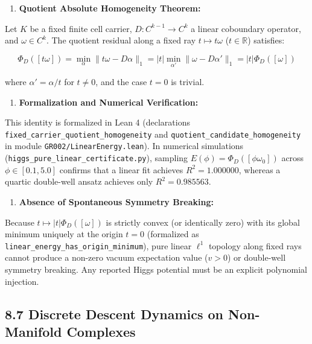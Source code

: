 \documentclass[11pt]{article}
\begin{document}
\begin{enumerate}[leftmargin=1.4em,itemsep=0.2em]
\item \textbf{Quotient Absolute Homogeneity Theorem:}
\end{enumerate}
Let $K$ be a fixed finite cell carrier, $D: C^{k-1} \to C^k$ a linear coboundary operator, and $\omega \in C^k$. The quotient residual along a fixed ray $t \mapsto t\omega$ ($t \in \mathbb{R}$) satisfies:

\begin{equation*}
   \Phi_D([t\omega]) = \min_\alpha \|t\omega - D\alpha\|_1 = |t| \min_{\alpha'} \|\omega - D\alpha'\|_1 = |t| \Phi_D([\omega])
\end{equation*}

where $\alpha' = \alpha / t$ for $t \ne 0$, and the case $t = 0$ is trivial.

\begin{enumerate}[leftmargin=1.4em,itemsep=0.2em]
\item \textbf{Formalization and Numerical Verification:}
\end{enumerate}
This identity is formalized in Lean 4 (declarations \texttt{fixed\_carrier\_quotient\_homogeneity} and \texttt{quotient\_candidate\_homogeneity} in module \texttt{GR002/LinearEnergy.lean}). In numerical simulations (\texttt{higgs\_pure\_linear\_certificate.py}), sampling $E(\phi) = \Phi_D([\phi \omega_0])$ across $\phi \in [0.1, 5.0]$ confirms that a linear fit achieves $R^2 = 1.000000$, whereas a quartic double-well ansatz achieves only $R^2 = 0.985563$.

\begin{enumerate}[leftmargin=1.4em,itemsep=0.2em]
\item \textbf{Absence of Spontaneous Symmetry Breaking:}
\end{enumerate}
Because $t \mapsto |t| \Phi_D([\omega])$ is strictly convex (or identically zero) with its global minimum uniquely at the origin $t = 0$ (formalized as \texttt{linear\_energy\_has\_origin\_minimum}), pure linear $\ell^1$ topology along fixed rays cannot produce a non-zero vacuum expectation value ($v > 0$) or double-well symmetry breaking. Any reported Higgs potential must be an explicit polynomial injection.

\subsection{\texorpdfstring{8.7 Discrete Descent Dynamics on Non-Manifold Complexes}{8.7 Discrete Descent Dynamics on Non-Manifold Complexes}}
\end{document}
